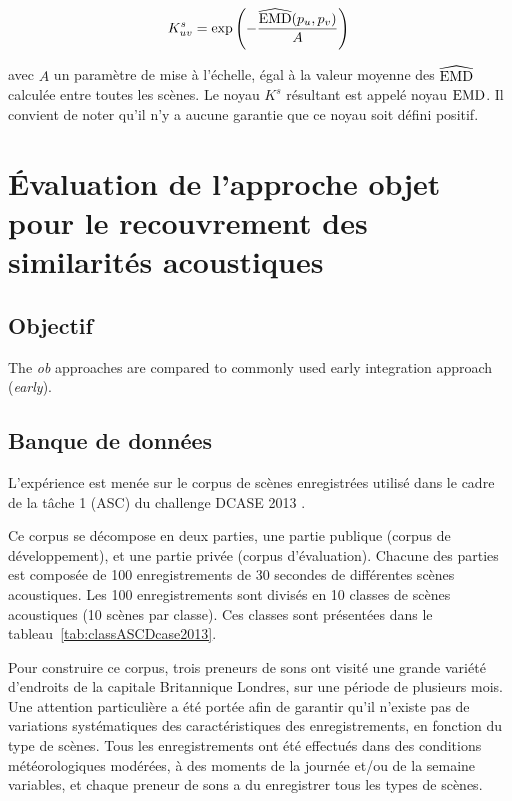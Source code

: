 \begin{equation}
\label{eq:ks}
K_{uv}^s = \exp\left( - \dfrac{\widehat{\mathrm{EMD}}(p_u,p_v)}{A} \right) \\
\end{equation}

avec $A$ un paramètre de mise à l'échelle, égal à la valeur moyenne des $\widehat{\mathrm{EMD}}$ calculée entre toutes les scènes. Le noyau $K^s$ résultant est appelé noyau $\mathrm{EMD}$. Il convient de noter qu'il n'y a aucune garantie que ce noyau soit défini positif.

\section[Évaluation de l'approche objet]{Évaluation de l'approche objet pour le recouvrement des similarités acoustiques}

\subsection{Objectif}


The \emph{ob} approaches are compared to commonly used early integration approach (\emph{early}).


\subsection{Banque de données}

L'expérience est menée sur le corpus de scènes enregistrées utilisé dans le cadre de la tâche 1 (ASC) du challenge DCASE 2013 \citep{giannoulis2013detection,Giannoulis2013database,Stowell15}.

Ce corpus se décompose en deux parties, une partie publique (corpus de développement), et une partie privée (corpus d'évaluation). Chacune des parties est composée de 100 enregistrements de 30 secondes de différentes scènes acoustiques. Les 100 enregistrements sont divisés en 10 classes de scènes acoustiques (10 scènes par classe). Ces classes sont présentées dans le tableau~\ref{tab:classASCDcase2013}. 

Pour construire ce corpus, trois preneurs de sons ont visité une grande variété d'endroits de la capitale Britannique Londres, sur une période de plusieurs mois. Une attention particulière a été portée afin de garantir qu'il n'existe pas de variations systématiques des caractéristiques des enregistrements, en fonction du type de scènes. Tous les enregistrements ont été effectués dans des conditions météorologiques modérées, à des moments de la journée et/ou de la semaine variables, et chaque preneur de sons a du enregistrer tous les types de scènes. 


